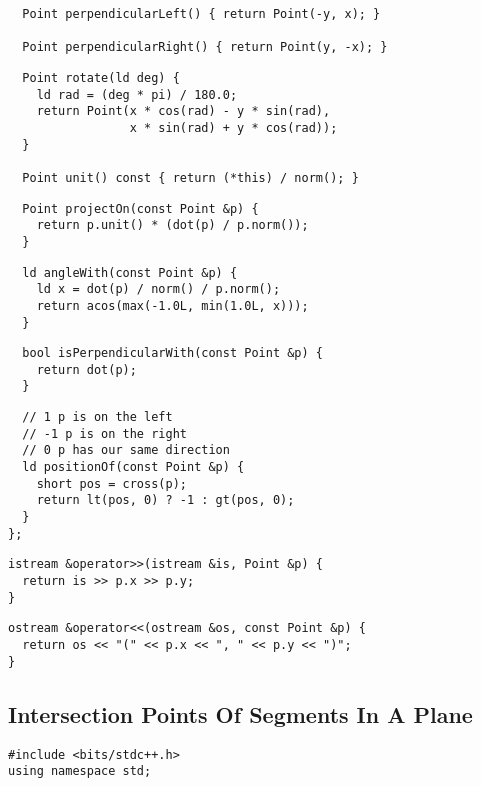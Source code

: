 \documentclass[twoside]{article}
\newcommand{\fileTitleStyle}{\large\underline}
\begin{document}
\begin{multicols*}{2}
\begin{verbatim}
  Point perpendicularLeft() { return Point(-y, x); }

  Point perpendicularRight() { return Point(y, -x); }
\end{verbatim}
\vspace{-12pt}
\begin{verbatim}
  Point rotate(ld deg) {
    ld rad = (deg * pi) / 180.0;
    return Point(x * cos(rad) - y * sin(rad),
                 x * sin(rad) + y * cos(rad));
  }

  Point unit() const { return (*this) / norm(); }
\end{verbatim}
\vspace{-12pt}
\begin{verbatim}
  Point projectOn(const Point &p) {
    return p.unit() * (dot(p) / p.norm());
  }
\end{verbatim}
\vspace{-12pt}
\begin{verbatim}
  ld angleWith(const Point &p) {
    ld x = dot(p) / norm() / p.norm();
    return acos(max(-1.0L, min(1.0L, x)));
  }
\end{verbatim}
\vspace{-12pt}
\begin{verbatim}
  bool isPerpendicularWith(const Point &p) {
    return dot(p);
  }
\end{verbatim}
\vspace{-12pt}
\begin{verbatim}
  // 1 p is on the left
  // -1 p is on the right
  // 0 p has our same direction
  ld positionOf(const Point &p) {
    short pos = cross(p);
    return lt(pos, 0) ? -1 : gt(pos, 0);
  }
};
\end{verbatim}
\vspace{-12pt}
\begin{verbatim}
istream &operator>>(istream &is, Point &p) {
  return is >> p.x >> p.y;
}
\end{verbatim}
\vspace{-12pt}
\begin{verbatim}
ostream &operator<<(ostream &os, const Point &p) {
  return os << "(" << p.x << ", " << p.y << ")";
}
\end{verbatim}

\subsectionfont{\centering\bfseries\LARGE}
\subsectionfont{\fileTitleStyle}
\subsection*{Intersection Points Of Segments In A Plane}
\begin{verbatim}
#include <bits/stdc++.h>
using namespace std;


\end{verbatim}
\end{multicols*}
\end{document}
